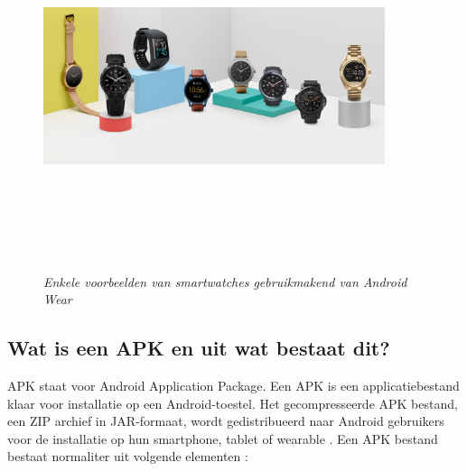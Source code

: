 \begin{figure}[H]
	\centering
	\caption{\textit{Enkele voorbeelden van smartwatches gebruikmakend van Android Wear}}
	\includegraphics[width=10cm, height=10cm, keepaspectratio]{img/WearExamples}\\[.5cm]
\end{figure}
\subsection{Wat is een APK en uit wat bestaat dit?}
APK staat voor Android Application Package. Een APK is een applicatiebestand klaar voor installatie op een Android-toestel. Het gecompresseerde APK bestand, een ZIP archief in JAR-formaat, wordt gedistribueerd naar Android gebruikers voor de installatie op hun smartphone, tablet of wearable \autocite{PCMag}.
Een APK bestand bestaat normaliter uit volgende elementen : 

